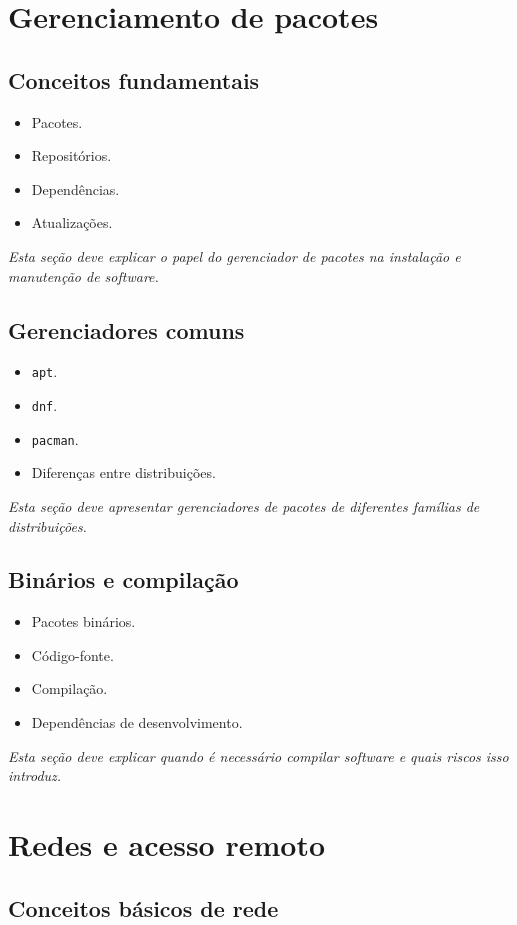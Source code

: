 \documentclass[12pt,openany]{book}
\newcommand{\placeholder}[1]{
    \par\medskip
    \noindent\textit{#1}
    \par\medskip
}
\newcommand{\topicos}[1]{
    \begin{itemize}
        #1
    \end{itemize}
}
\begin{document}
\begin{refsection}
\chapter{Gerenciamento de pacotes}

\section{Conceitos fundamentais}

\topicos{
    \item Pacotes.
    \item Repositórios.
    \item Dependências.
    \item Atualizações.
}

\placeholder{Esta seção deve explicar o papel do gerenciador de pacotes na instalação e manutenção de software.}

\section{Gerenciadores comuns}

\topicos{
    \item \texttt{apt}.
    \item \texttt{dnf}.
    \item \texttt{pacman}.
    \item Diferenças entre distribuições.
}

\placeholder{Esta seção deve apresentar gerenciadores de pacotes de diferentes famílias de distribuições.}

\section{Binários e compilação}

\topicos{
    \item Pacotes binários.
    \item Código-fonte.
    \item Compilação.
    \item Dependências de desenvolvimento.
}

\placeholder{Esta seção deve explicar quando é necessário compilar software e quais riscos isso introduz.}

\chapter{Redes e acesso remoto}

\section{Conceitos básicos de rede}


\end{refsection}
\end{document}
